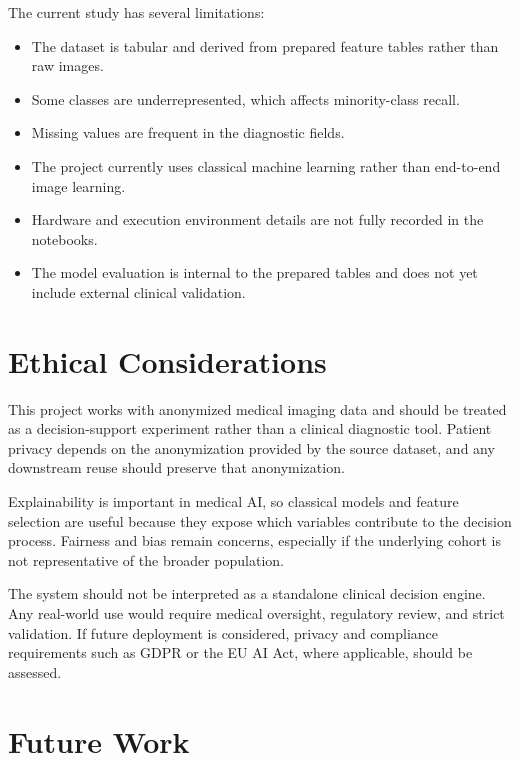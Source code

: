 \documentclass[11pt,a4paper]{article}
\begin{document}
The current study has several limitations:
\begin{itemize}[leftmargin=*]
    \item The dataset is tabular and derived from prepared feature tables rather than raw images.
    \item Some classes are underrepresented, which affects minority-class recall.
    \item Missing values are frequent in the diagnostic fields.
    \item The project currently uses classical machine learning rather than end-to-end image learning.
    \item Hardware and execution environment details are not fully recorded in the notebooks.
    \item The model evaluation is internal to the prepared tables and does not yet include external clinical validation.
\end{itemize}


\section{Ethical Considerations}


This project works with anonymized medical imaging data and should be treated as a decision-support experiment rather than a clinical diagnostic tool. Patient privacy depends on the anonymization provided by the source dataset, and any downstream reuse should preserve that anonymization.

Explainability is important in medical AI, so classical models and feature selection are useful because they expose which variables contribute to the decision process. Fairness and bias remain concerns, especially if the underlying cohort is not representative of the broader population.

The system should not be interpreted as a standalone clinical decision engine. Any real-world use would require medical oversight, regulatory review, and strict validation. If future deployment is considered, privacy and compliance requirements such as GDPR or the EU AI Act, where applicable, should be assessed.

\section{Future Work}
\end{document}
